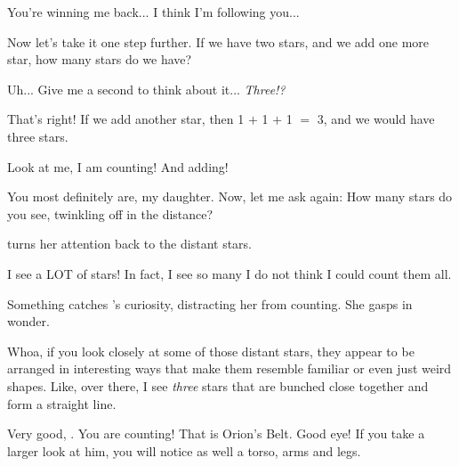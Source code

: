 \documentclass[main.tex]{subfiles}
\begin{document}
\par \Maia You're winning me back...  I think I'm following you...

\par \Pleione Now let's take it one step further.  If we have two stars, and we add one more star, how many stars do we have?

 
\par \Maia Uh... Give me a second to think about it... \textit{Three!?}

\par \Pleione That's right!  If we add another star, then 1 $+$ 1 $+$ 1 $=$ 3, and we would have three stars.  

\par \Maia Look at me, I am counting!  And adding!

\par \Pleione You most definitely are, my daughter.  Now, let me ask again:  How many stars do you see, twinkling off in the distance?

\par \nar \rmmaia turns her attention back to the distant stars.  

\par \Maia I see a LOT of stars!  In fact, I see so many I do not think I could count them all.

\par \nar Something catches \rmmaia's curiosity, distracting her from counting.  She gasps in wonder.

\par \Maia Whoa, if you look closely at some of those distant stars, they appear to be arranged in interesting ways that make them resemble familiar or even just weird shapes.  Like, over there, I see \textit{three} stars that are bunched close together and form a straight line.

\par \Pleione Very good, \rmmaia.  You are counting!  That is Orion's Belt.  Good eye!  If you take a larger look at him, you will notice as well a torso, arms and legs.  
\end{document}
